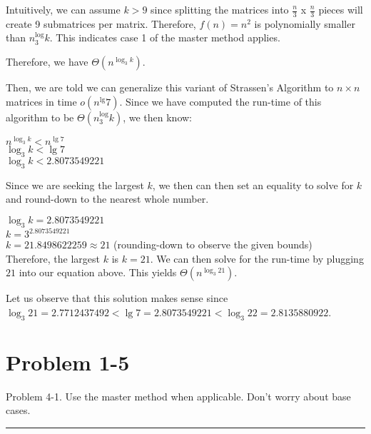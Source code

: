 \documentclass[11pt]{article}
\def\separateline{\medskip\hrule\medskip}
\begin{document}
Intuitively, we can assume $k > 9$ since splitting the matrices into $\frac{n}{3}$ x $\frac{n}{3}$ pieces will create 9 submatrices per matrix. Therefore, $f(n) = n^2$ is polynomially smaller than $n^\log_3{k}$. This indicates case 1 of the master method applies.

Therefore, we have $\Theta(n^{\log_3{k}})$.

Then, we are told we can generalize this variant of Strassen's Algorithm to $n \times n$ matrices in time $o(n^\lg{7})$. Since we have computed the run-time of this algorithm to be $\Theta(n^\log_3{k})$, we then know:

$n^{\log_3{k}} < n^{\lg{7}}$ \\
$\log_3{k} < \lg{7}$ \\
$\log_3{k} < 2.8073549221$

Since we are seeking the largest $k$, we then can then set an equality to solve for $k$ and round-down to the nearest whole number.

$\log_3{k} = 2.8073549221$ \\
$k = 3^{2.8073549221}$ \\
$k = 21.8498622259 \approx 21$ (rounding-down to observe the given bounds) \\

Therefore, the largest $k$ is $k = 21$. We can then solve for the run-time by plugging $21$ into our equation above. This yields $\Theta(n^{\log_3{21}})$.

Let us observe that this solution makes sense since $\log_3{21} = 2.7712437492 < \lg{7} = 2.8073549221 < \log_3{22} = 2.8135880922$.

\newpage

\section{Problem 1-5}
Problem 4-1. Use the master method when applicable. Don’t worry about base cases.
\separateline
\end{document}
